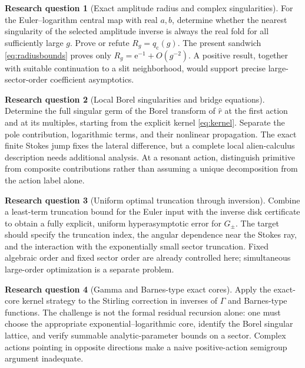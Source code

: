 \documentclass[11pt,a4paper]{article}
\numberwithin{equation}{section}
\theoremstyle{definition}
\newtheorem{problem}{Research question}
\theoremstyle{remark}
\newcommand{\e}{\mathrm e}
\begin{document}
\begin{problem}[Exact amplitude radius and complex singularities]
For the Euler--logarithm central map with real $a,b$, determine whether the nearest singularity of the selected amplitude inverse is always the real fold for all sufficiently large $g$. Prove or refute $R_g=q_{\mathrm c}(g)$. The present sandwich \eqref{eq:radiusbounds} proves only $R_g=\e^{-1}+O(g^{-2})$. A positive result, together with suitable continuation to a slit neighborhood, would support precise large-sector-order coefficient asymptotics.
\end{problem}

\begin{problem}[Local Borel singularities and bridge equations]
Determine the full singular germ of the Borel transform of $\widehat r$ at the first action and at its multiples, starting from the explicit kernel \eqref{eq:kernel}. Separate the pole contribution, logarithmic terms, and their nonlinear propagation. The exact finite Stokes jump fixes the lateral difference, but a complete local alien-calculus description needs additional analysis. At a resonant action, distinguish primitive from composite contributions rather than assuming a unique decomposition from the action label alone.
\end{problem}

\begin{problem}[Uniform optimal truncation through inversion]
Combine a least-term truncation bound for the Euler input with the inverse disk certificate to obtain a fully explicit, uniform hyperasymptotic error for $G_\pm$. The target should specify the truncation index, the angular dependence near the Stokes ray, and the interaction with the exponentially small sector truncation. Fixed algebraic order and fixed sector order are already controlled here; simultaneous large-order optimization is a separate problem.
\end{problem}

\begin{problem}[Gamma and Barnes-type exact cores]
Apply the exact-core kernel strategy to the Stirling correction in inverses of $\Gamma$ and Barnes-type functions. The challenge is not the formal residual recursion alone: one must choose the appropriate exponential--logarithmic core, identify the Borel singular lattice, and verify summable analytic-parameter bounds on a sector. Complex actions pointing in opposite directions make a naive positive-action semigroup argument inadequate.
\end{problem}
\end{document}
